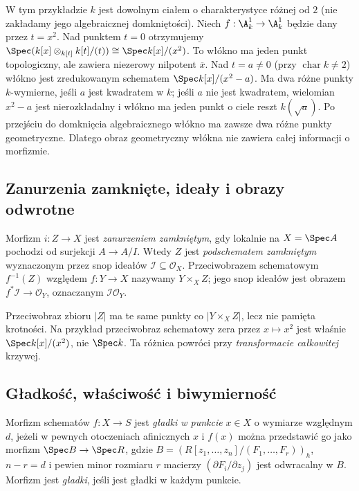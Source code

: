 \begin{przyklad}
\label{prz:ga5-double-fibre}
W tym przykładzie $k$ jest dowolnym ciałem o charakterystyce różnej od $2$ (nie zakładamy jego algebraicznej domkniętości).
Niech $f:\A^1_k\to\A^1_k$ będzie dany przez $t=x^2$.
Nad punktem $t=0$ otrzymujemy
$\Spec(k[x]\otimes_{k[t]}k[t]/(t))\cong\Spec k[x]/(x^2)$.
To włókno ma jeden punkt topologiczny, ale zawiera niezerowy
nilpotent $\overline x$. Nad $t=a\ne0$ (przy $\operatorname{char}k\ne2$)
włókno jest zredukowanym schematem $\Spec k[x]/(x^2-a)$.
Ma dwa różne punkty $k$-wymierne, jeśli $a$ jest kwadratem
w $k$; jeśli $a$ nie jest kwadratem, wielomian $x^2-a$
jest nierozkładalny i włókno ma jeden punkt o ciele reszt
$k(\sqrt a)$. Po przejściu do domknięcia algebraicznego
włókno ma zawsze dwa różne punkty geometryczne.
Dlatego obraz geometryczny włókna nie zawiera całej informacji
o morfizmie.
\end{przyklad}

\subsection{Zanurzenia zamknięte, ideały i obrazy odwrotne}

\begin{definicja}
Morfizm $i:Z\to X$ jest \emph{zanurzeniem zamkniętym}, gdy
lokalnie na $X=\Spec A$ pochodzi od surjekcji $A\to A/I$.
Wtedy $Z$ jest \emph{podschematem zamkniętym} wyznaczonym
przez snop ideałów $\mathcal I\subseteq\mathcal O_X$.
Przeciwobrazem schematowym $f^{-1}(Z)$ względem $f:Y\to X$
nazywamy $Y\times_X Z$; jego snop ideałów jest
obrazem $f^*\mathcal I\to\mathcal O_Y$, oznaczanym
$\mathcal I\mathcal O_Y$.
\end{definicja}

\begin{uwaga}
Przeciwobraz zbioru $|Z|$ ma te same punkty co
$|Y\times_X Z|$, lecz nie pamięta krotności. Na przykład
przeciwobraz schematowy zera przez $x\mapsto x^2$
jest właśnie $\Spec k[x]/(x^2)$, nie $\Spec k$.
Ta różnica powróci przy \emph{transformacie całkowitej} krzywej.
\end{uwaga}

\subsection{Gładkość, właściwość i biwymierność}

\begin{definicja}
\label{def:ga5-smooth}
Morfizm schematów $f:X\to S$ jest \emph{gładki w punkcie}
$x\in X$ o wymiarze względnym $d$, jeżeli w pewnych otoczeniach
afinicznych $x$ i $f(x)$ można przedstawić go jako morfizm
$\Spec B\to\Spec R$, gdzie
$B=(R[z_1,\ldots,z_n]/(F_1,\ldots,F_r))_h$,
$n-r=d$ i pewien minor rozmiaru $r$ macierzy
$(\partial F_i/\partial z_j)$ jest odwracalny w $B$.
Morfizm jest \emph{gładki}, jeśli jest gładki w każdym punkcie.
\end{definicja}

